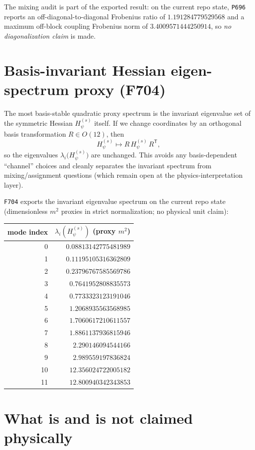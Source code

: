 \documentclass[11pt,a4paper]{article}
\begin{document}
The mixing audit is part of the exported result: on the current repo state, \texttt{P696} reports
an off-diagonal-to-diagonal Frobenius ratio of $1.191284779529568$ and a maximum off-block coupling Frobenius norm of $3.4009571444250914$,
so \emph{no diagonalization claim} is made.

\section{Basis-invariant Hessian eigen-spectrum proxy (F704)}

The most basis-stable quadratic proxy spectrum is the invariant eigenvalue set of the symmetric Hessian $H_{\psi}^{(s)}$ itself.
If we change coordinates by an orthogonal basis transformation $R\in O(12)$, then
\[
H_{\psi}^{(s)} \mapsto R\,H_{\psi}^{(s)}\,R^{\mathsf T},
\]
so the eigenvalues $\lambda_i\bigl(H_{\psi}^{(s)}\bigr)$ are unchanged. This avoids any basis-dependent “channel” choices and cleanly separates
the invariant spectrum from mixing/assignment questions (which remain open at the physics-interpretation layer).

\texttt{F704} exports the invariant eigenvalue spectrum on the current repo state (dimensionless $m^2$ proxies in strict normalization; no physical unit claim):

\begin{center}
\begin{tabular}{rr}
\toprule
mode index & $\lambda_i(H_{\psi}^{(s)})$ (proxy $m^2$)\\
\midrule
0 & $0.08813142775481989$\\
1 & $0.11195105316362809$\\
2 & $0.23796767585569786$\\
3 & $0.7641952808835573$\\
4 & $0.7733323123191046$\\
5 & $1.2068935563568985$\\
6 & $1.7060617210611557$\\
7 & $1.8861137936815946$\\
8 & $2.290146094544166$\\
9 & $2.989559197836824$\\
10 & $12.356024722005182$\\
11 & $12.800940342343853$\\
\bottomrule
\end{tabular}
\end{center}

\section{What is and is not claimed physically}
\end{document}
